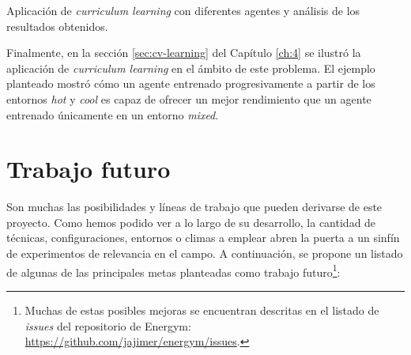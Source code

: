 \begin{tcolorbox}[colbacktitle=green!30!white, title=Subobjetivo 5, coltitle=black, fonttitle=\bfseries]
Aplicación de \textit{curriculum learning} con diferentes agentes y análisis de los resultados obtenidos.
\end{tcolorbox}

Finalmente, en la sección \ref{sec:cv-learning} del Capítulo \ref{ch:4} se ilustró la aplicación de \textit{curriculum learning} en el ámbito de este problema. El ejemplo planteado mostró cómo un agente entrenado progresivamente a partir de los entornos \textit{hot} y \textit{cool} es capaz de ofrecer un mejor rendimiento que un agente entrenado únicamente en un entorno \textit{mixed}.

\section{Trabajo futuro}
\label{sec:trabajo-futuro}

Son muchas las posibilidades y líneas de trabajo que pueden derivarse de este proyecto. Como hemos podido ver a lo largo de su desarrollo, la cantidad de técnicas, configuraciones, entornos o climas a emplear abren la puerta a un sinfín de experimentos de relevancia en el campo. A continuación, se propone un listado de algunas de las principales metas planteadas como trabajo futuro\footnote{Muchas de estas posibles mejoras se encuentran descritas en el listado de \textit{issues} del repositorio de Energym: \url{https://github.com/jajimer/energym/issues}.}:

